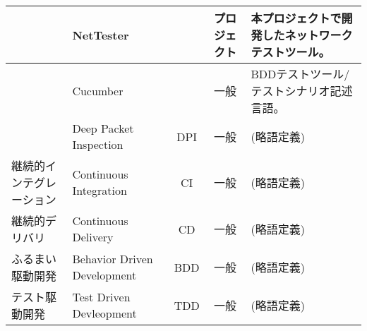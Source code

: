 \begin{longtable}{p{8em}|p{8em}|c|c|p{16em}}
  & NetTester & & プロジェクト & 本プロジェクトで開発したネットワークテストツール。 \\ \hline
  & Cucumber & & 一般 & BDDテストツール/テストシナリオ記述言語。 \\ \hline
  & Deep Packet Inspection & DPI & 一般 & (略語定義) \\ \hline
  継続的インテグレーション & Continuous Integration & CI & 一般 & (略語定義) \\ \hline
  継続的デリバリ & Continuous Delivery & CD & 一般 & (略語定義) \\ \hline
  ふるまい駆動開発 & Behavior Driven Development & BDD & 一般 & (略語定義) \\ \hline
  テスト駆動開発 & Test Driven Devleopment & TDD & 一般 & (略語定義) \\ \hline
  
 \end{longtable}

